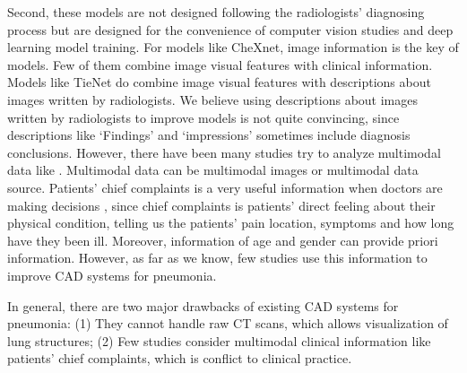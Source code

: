 \documentclass[journal]{IEEEtran}
\begin{document}
Second, these models are not designed following the radiologists' diagnosing process but are designed for the convenience of computer vision studies and deep learning model training. For models like CheXnet, image information is the key of models. Few of them combine image visual features with clinical information. 
Models like TieNet do combine image visual features with descriptions about images written by radiologists. We believe using descriptions about images written by radiologists to improve models is not quite convincing, since descriptions like `Findings' and `impressions' sometimes include diagnosis conclusions.
However, there have been many studies try to analyze multimodal data like \cite{hu2019deep, xiao2018alternating}. Multimodal data can be multimodal images \cite{dou2016multilevel} or multimodal data source. 
Patients' chief complaints is a very useful information when doctors are making decisions \cite{wu2018master}, since chief complaints is patients' direct feeling about their physical condition, telling us the patients' pain location, symptoms and how long have they been ill. Moreover, information of age and gender can provide priori information\cite{xiaojian2011analysis, huang2014design}. However, as far as we know, few studies use this information to improve CAD systems for pneumonia. 

In general, there are two major drawbacks of existing CAD systems for pneumonia: (1) They cannot handle raw CT scans, which allows visualization of lung structures; (2) Few studies consider multimodal clinical information like patients' chief complaints, which is conflict to clinical practice.
\end{document}
